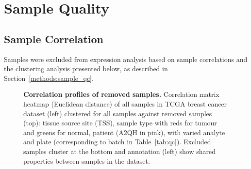 

\chapter{Sample Quality}
\label{appendix:sample_checking}

\section{Sample Correlation}
\label{appendix:sample_correlation}

Samples were excluded from expression analysis based on sample correlations and the clustering analysis presented below, as described in Section~\ref{methods:sample_qc}.  

\begin{figure}[!ht]
\begin{mdframed}
  \begin{center}
   \end{center}
   \caption[Correlation profiles of removed samples]{\small \textbf{Correlation profiles of removed samples.} Correlation matrix heatmap (Euclidean distance) of all samples in TCGA breast cancer dataset (left) clustered for all samples against removed samples (top): tissue source site (TSS), sample type with reds for tumour and greens for normal, patient (A2QH in pink), with varied analyte and plate (corresponding to batch in Table~\ref{tab:qc}). Excluded samples cluster at the bottom and annotation (left) show  shared properties between samples in the dataset.
   }
\label{fig:corr_map_part}
\end{mdframed}
\end{figure}


